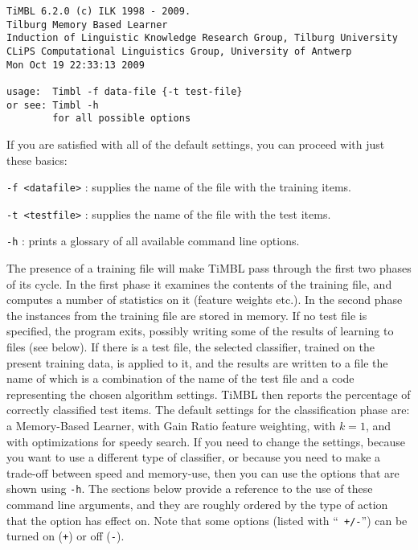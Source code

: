 \documentclass{report}
\begin{document}
{\footnotesize
\begin{verbatim}
TiMBL 6.2.0 (c) ILK 1998 - 2009.
Tilburg Memory Based Learner
Induction of Linguistic Knowledge Research Group, Tilburg University
CLiPS Computational Linguistics Group, University of Antwerp
Mon Oct 19 22:33:13 2009

usage:  Timbl -f data-file {-t test-file}
or see: Timbl -h
        for all possible options
\end{verbatim}
}

If you are satisfied with all of the default settings, you can proceed
with just these basics:

\begin{description}

\item {\tt -f <datafile>} : supplies the name of the file with the
training items.
\item {\tt -t <testfile>} : supplies the name of the file with the
test items.
\item {\tt -h} : prints a glossary of all available command line 
options.

\end{description}

The presence of a training file will make TiMBL pass through the first
two phases of its cycle. In the first phase it examines the contents
of the training file, and computes a number of statistics on it
(feature weights etc.). In the second phase the instances from the
training file are stored in memory. If no test file is specified, the
program exits, possibly writing some of the results of learning to
files (see below). If there is a test file, the selected classifier,
trained on the present training data, is applied to it, and the
results are written to a file the name of which is a combination of
the name of the test file and a code representing the chosen algorithm
settings. TiMBL then reports the percentage of correctly classified
test items. The default settings for the classification phase are: a
Memory-Based Learner, with Gain Ratio feature weighting, with $k=1$,
and with optimizations for speedy search. If you need to change the
settings, because you want to use a different type of classifier, or
because you need to make a trade-off between speed and memory-use,
then you can use the options that are shown using {\tt -h}. The
sections below provide a reference to the use of these command line
arguments, and they are roughly ordered by the type of action that the
option has effect on. Note that some options (listed with ``{\tt
  +/-}'') can be turned on ({\tt +}) or off ({\tt -}).
\end{document}

